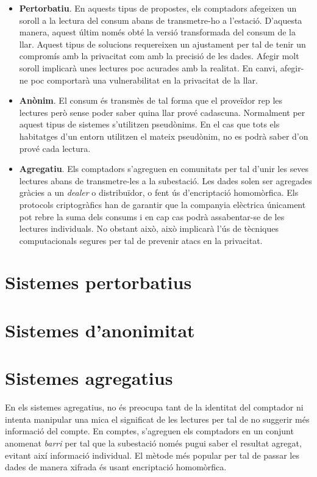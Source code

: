 \documentclass{article}
\begin{document}
\begin{itemize}
	\item \textbf{Pertorbatiu}. En aquests tipus de propostes, els comptadors afegeixen un soroll a la lectura del consum abans de transmetre-ho a l'estació. D'aquesta manera, aquest últim només obté la versió transformada del consum de la llar. Aquest tipus de solucions requereixen un ajustament per tal de tenir un compromís amb la privacitat com amb la precisió de les dades. Afegir molt soroll implicarà unes lectures poc acurades amb la realitat. En canvi, afegir-ne poc comportarà una vulnerabilitat en la privacitat de la llar. 
	\item \textbf{Anònim}. El consum és transmès de tal forma que el proveïdor rep les lectures però sense poder saber quina llar prové cadascuna. Normalment per aquest tipus de sistemes s'utilitzen pseudònims. En el cas que tots els habitatges d'un entorn utilitzen el mateix pseudònim, no es podrà saber d'on prové cada lectura.
	\item \textbf{Agregatiu}. Els comptadors s'agreguen en comunitats per tal d'unir les seves lectures abans de transmetre-les a la subestació. Les dades solen ser agregades gràcies a un \textit{dealer} o distribuïdor, o fent ús d'encriptació homomòrfica. Els protocols criptogràfics han de garantir que la companyia elèctrica únicament pot rebre la suma dels consums i en cap cas podrà assabentar-se de les lectures individuals. No obstant això, això implicarà l'ús de tècniques computacionals segures per tal de prevenir atacs en la privacitat.
\end{itemize}
\section{Sistemes pertorbatius}

\section{Sistemes d'anonimitat}

\section{Sistemes agregatius}
En els sistemes agregatius, no és preocupa tant de la identitat del comptador ni intenta manipular una mica el significat de les lectures per tal de no suggerir més informació del compte. En comptes, s'agreguen els comptadors en un conjunt anomenat \textit{barri} per tal que la subestació només pugui saber el resultat agregat, evitant així informació individual. El mètode més popular per tal de passar les dades de manera xifrada és usant encriptació homomòrfica. 
\end{document}
